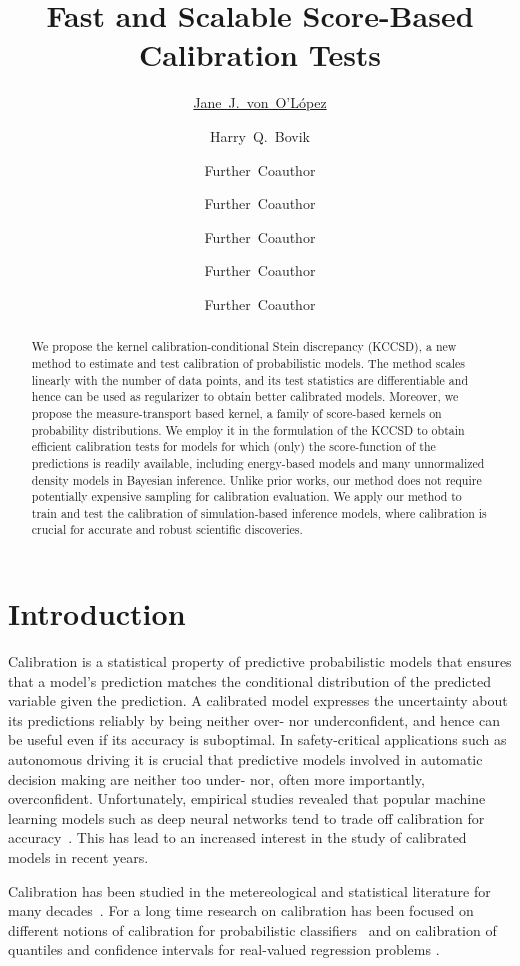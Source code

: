 \documentclass{uai2023} %
\title{Fast and Scalable Score-Based Calibration Tests}
\author[1]{\href{mailto:<jj@example.edu>?Subject=Your UAI 2023 paper}{Jane~J.~von~O'L\'opez}{}}
\author[1]{Harry~Q.~Bovik}
\author[1,2]{Further~Coauthor}
\author[3]{Further~Coauthor}
\author[1]{Further~Coauthor}
\author[3]{Further~Coauthor}
\author[3,1]{Further~Coauthor}
\affil[1]{%
    Computer Science Dept.\\
    Cranberry University\\
    Pittsburgh, Pennsylvania, USA
}
\affil[2]{%
    Second Affiliation\\
    Address\\
    …
}
\affil[3]{%
    Another Affiliation\\
    Address\\
    …
  }
\begin{document}
\maketitle

\begin{abstract}
We propose the kernel calibration-conditional Stein discrepancy (KCCSD), a new method to estimate and test calibration of probabilistic models.
The method scales linearly with the number of data points, and its test statistics are differentiable and hence can be used as regularizer to obtain better calibrated models.
Moreover, we propose the measure-transport based kernel, a family of score-based kernels on probability distributions.
We employ it in the formulation of the KCCSD to obtain efficient calibration tests for models for which (only) the score-function of the predictions is readily available, including energy-based models and many unnormalized density models in Bayesian inference.
Unlike prior works, our method does not require potentially expensive sampling for calibration evaluation.
We apply our method to train and test the calibration of simulation-based inference models, where calibration is crucial for accurate and robust scientific discoveries.
\end{abstract}

\section{Introduction}\label{sec:introduction}

Calibration is a statistical property of predictive probabilistic models that ensures that a model's prediction matches the conditional distribution of the predicted variable given the prediction.
A calibrated model expresses the uncertainty about its predictions reliably by being neither over- nor underconfident, and hence can be useful even if its accuracy is suboptimal.
In safety-critical applications such as autonomous driving it is crucial that predictive models involved in automatic decision making are neither too under- nor, often more importantly, overconfident.
Unfortunately, empirical studies revealed that popular machine learning models such as deep neural networks tend to trade off calibration for accuracy~\cite{Guo2017}.
This has lead to an increased interest in the study of calibrated models in recent years.

Calibration has been studied in the metereological and statistical literature for many decades~\citep[e.g.,][]{Murphy1977,DeGroot1983}.
For a long time research on calibration has been focused on different notions of calibration for probabilistic classifiers~\citep[e.g.,][]{Murphy1977,DeGroot1983,Platt2000,Broecker2009,Guo2017,Kull2017,kumar18train,Kull2019,widmann2019calibration,vaicenavicius2019evaluating,zadrozny2001obtaining,Naeini2015} and on calibration of quantiles and confidence intervals for real-valued regression problems \citep[e.g.,][]{song2019distribution,Fasiolo2020,Rueda2006,Ho2005,Taillardat2016}.
\end{document}
